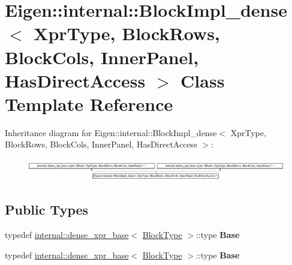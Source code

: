 \hypertarget{class_eigen_1_1internal_1_1_block_impl__dense}{}\section{Eigen\+:\+:internal\+:\+:Block\+Impl\+\_\+dense$<$ Xpr\+Type, Block\+Rows, Block\+Cols, Inner\+Panel, Has\+Direct\+Access $>$ Class Template Reference}
\label{class_eigen_1_1internal_1_1_block_impl__dense}
Inheritance diagram for Eigen\+:\+:internal\+:\+:Block\+Impl\+\_\+dense$<$ Xpr\+Type, Block\+Rows, Block\+Cols, Inner\+Panel, Has\+Direct\+Access $>$\+:\begin{figure}[H]
\begin{center}
\leavevmode
\includegraphics[height=0.957265cm]{class_eigen_1_1internal_1_1_block_impl__dense}
\end{center}
\end{figure}
\subsection*{Public Types}
\begin{DoxyCompactItemize}
\item 
\mbox{\label{class_eigen_1_1internal_1_1_block_impl__dense_a82e7e22b0f7dfac2a9d51c83e6466f72}} 
typedef \hyperlink{struct_eigen_1_1internal_1_1dense__xpr__base}{internal\+::dense\+\_\+xpr\+\_\+base}$<$ \hyperlink{group___core___module_class_eigen_1_1_block}{Block\+Type} $>$\+::type {\bfseries Base}
\item 
\mbox{\label{class_eigen_1_1internal_1_1_block_impl__dense_a82e7e22b0f7dfac2a9d51c83e6466f72}} 
typedef \hyperlink{struct_eigen_1_1internal_1_1dense__xpr__base}{internal\+::dense\+\_\+xpr\+\_\+base}$<$ \hyperlink{group___core___module_class_eigen_1_1_block}{Block\+Type} $>$\+::type {\bfseries Base}
\end{DoxyCompactItemize}
